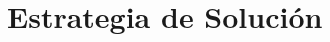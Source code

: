 \cleardoublepage
\chapter{Estrategia de Soluci\'{o}n}
\label{ch:solutionstrategy}
\label{ch:chapter4}

